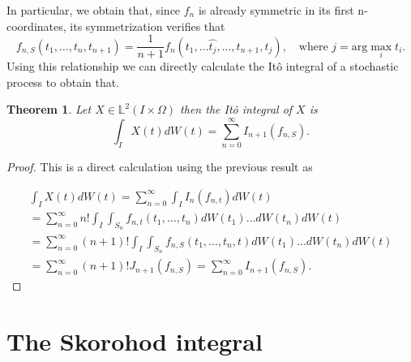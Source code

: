 \documentclass[12pt]{article}
\newtheorem{theorem}{Theorem}
\begin{document}
In particular, we obtain that, since $f_n$ is already symmetric in its first n-coordinates, its symmetrization verifies that
\begin{equation*}
	f_{n,S}(t_1,\ldots,t_n,t_{n+1})=\frac{1}{n+1}f_n(t_1,\ldots\hat{t_{j}},\ldots,t_{n+1},t_j),\quad \text{where } j=\text{arg}\max_i t_i.
\end{equation*}
Using this relationship we can directly calculate the Itô integral of a stochastic process to obtain that.
\begin{theorem}
	Let $X \in \mathbb{L}^2(I\times\Omega)$ then the Itô integral of $X$ is
	\begin{equation*}
		\int_{I} X(t) dW(t)=\sum_{n=0}^{\infty} I_{n+1}(f_{n,S}).
	\end{equation*}
\end{theorem}
\begin{proof}
	This is a direct calculation using the previous result as


	\begin{multline*}
		\int_{I} X(t) dW(t)=\sum_{n=0}^{\infty}\int_{I} I_n(f_{n,t})dW(t)\\=\sum_{n=0}^{\infty}n! \int_{I}\int_{S_n}f_{n,t}(t_1,\ldots,t_n) dW(t_1)\ldots dW(t_n) dW(t)\\=\sum_{n=0}^{\infty}(n+1)! \int_{I}\int_{S_n}f_{n,S}(t_1,\ldots,t_n,t) dW(t_1)\ldots dW(t_n) dW(t)\\=\sum_{n=0}^{\infty}(n+1)! J_{n+1}(f_{n,S}) =\sum_{n=0}^{\infty}  I_{n+1}(f_{n,S}).
	\end{multline*}

\end{proof}
\section{The Skorohod integral}%
\end{document}
